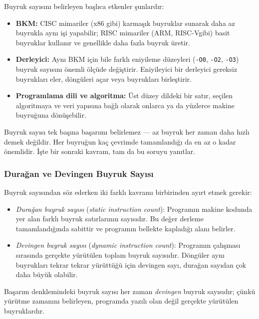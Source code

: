 Buyruk sayısını belirleyen başlıca etkenler şunlardır:
\begin{itemize}
    \item \textbf{BKM:} CISC mimariler (x86 gibi) karmaşık buyruklar sunarak daha az buyrukla aynı işi yapabilir; RISC mimariler (ARM, RISC-V\@ gibi) basit buyruklar kullanır ve genellikle daha fazla buyruk üretir.
    \item \textbf{Derleyici:} Aynı BKM için bile farklı eniyileme düzeyleri (\texttt{-O0}, \texttt{-O2}, \texttt{-O3}) buyruk sayısını önemli ölçüde değiştirir. Eniyileyici bir derleyici gereksiz buyrukları eler, döngüleri açar veya buyrukları birleştirir.
    \item \textbf{Programlama dili ve algoritma:} Üst düzey dildeki bir satır, seçilen algoritmaya ve veri yapısına bağlı olarak onlarca ya da yüzlerce makine buyruğuna dönüşebilir.
\end{itemize}

Buyruk sayısı tek başına başarımı belirlemez --- az buyruk her zaman daha hızlı demek değildir. Her buyruğun kaç çevrimde tamamlandığı da en az o kadar önemlidir. İşte bir sonraki kavram, tam da bu soruyu yanıtlar.

\subsubsection{Durağan ve Devingen Buyruk Sayısı}
\label{subsec:duragan-devingen}

Buyruk sayısından söz ederken iki farklı kavramı birbirinden ayırt etmek gerekir:

\begin{itemize}
    \item \emph{Durağan buyruk sayısı} (\textit{static instruction count}): Programın makine kodunda yer alan farklı buyruk satırlarının sayısıdır. Bu değer derleme tamamlandığında sabittir ve programın bellekte kapladığı alanı belirler.
    \item \emph{Devingen buyruk sayısı} (\textit{dynamic instruction count}): Programın çalışması sırasında gerçekte yürütülen toplam buyruk sayısıdır. Döngüler aynı buyrukları tekrar tekrar yürüttüğü için devingen sayı, durağan sayıdan çok daha büyük olabilir.
\end{itemize}

Başarım denklemindeki buyruk sayısı her zaman \emph{devingen} buyruk sayısıdır; çünkü yürütme zamanını belirleyen, programda yazılı olan değil gerçekte yürütülen buyruklardır.

